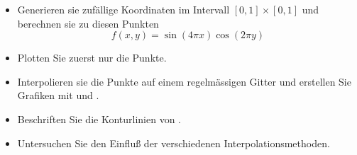 \begin{aufg}[0]
\begin{itemize}
\item Generieren sie zufällige Koordinaten im Intervall $[0,1]\times[0,1]$ und berechnen sie zu diesen Punkten 
\[ f(x,y) = \sin(4 \pi x) \cos(2 \pi y) \]
\item Plotten Sie zuerst nur die Punkte.
\item Interpolieren sie die Punkte auf einem regelmässigen Gitter und erstellen Sie Grafiken mit   und .
\item Beschriften Sie die Konturlinien von .
\item Untersuchen Sie den Einflu{\ss} der verschiedenen
  Interpolationsmethoden. 
\end{itemize}
\end{aufg}
